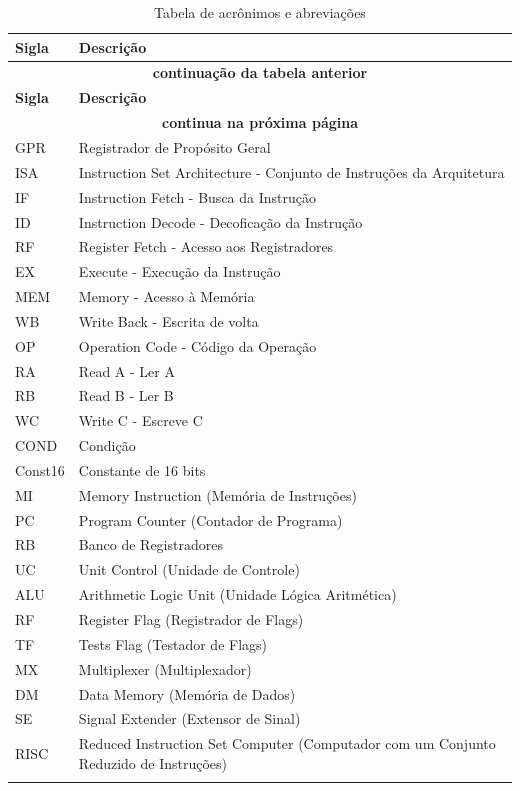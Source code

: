 \documentclass{report}
\begin{document}
\begin{center}
\begin{longtable}[pos]{|m{52pt} | m{350pt}|} \hline
	\cellcolor[gray]{0.9} \textbf{Sigla} & \cellcolor[gray]{0.9}\textbf{Descrição}\\ \hline \endfirsthead \hline
	\multicolumn{2}{|c|}{{\bfseries \textbf{continuação da tabela anterior}}} \\ \hline
	\cellcolor[gray]{0.9} \textbf{Sigla} & \cellcolor[gray]{0.9}\textbf{Descrição}\\ \hline \endhead
	\multicolumn{2}{|c|}{{\textbf{continua na próxima página}}} \\ \hline \endfoot
	\hline \endlastfoot
	
	GPR     & Registrador de Propósito Geral\\ \hline
    ISA     & Instruction Set Architecture - Conjunto de Instruções da Arquitetura\\ \hline
    IF      & Instruction Fetch - Busca da Instrução  \\ \hline
    ID      & Instruction Decode - Decoficação da Instrução \\ \hline
    RF      & Register Fetch -  Acesso aos Registradores\\ \hline
    EX      & Execute - Execução da Instrução\\ \hline
    MEM     & Memory - Acesso à Memória\\ \hline
    WB      & Write Back - Escrita de volta\\ \hline
    OP      & Operation Code - Código da Operação\\ \hline
    RA      & Read A - Ler A\\ \hline
    RB      & Read B - Ler B\\ \hline
    WC      & Write C - Escreve C\\ \hline
    COND    & Condição\\ \hline
    Const16 & Constante de 16 bits \\ \hline
    MI     & Memory Instruction (Memória de Instruções)\\ \hline
	PC     & Program Counter (Contador de Programa)\\ \hline
	RB     & Banco de Registradores\\ \hline
	UC     & Unit Control (Unidade de Controle)\\ \hline
	ALU    & Arithmetic Logic Unit (Unidade Lógica Aritmética)\\ \hline
	RF     & Register Flag (Registrador de Flags)\\ \hline
	TF     & Tests Flag (Testador de Flags)\\ \hline
	MX     & Multiplexer (Multiplexador)\\ \hline
	DM     & Data Memory (Memória de Dados)\\ \hline
	SE     & Signal Extender (Extensor de Sinal)\\ \hline
	RISC   & Reduced Instruction Set Computer (Computador com um Conjunto Reduzido de Instruções)\\ \hline

\caption{Tabela de acrônimos e abreviações}
\end{longtable}
\end{center}
\end{document}
